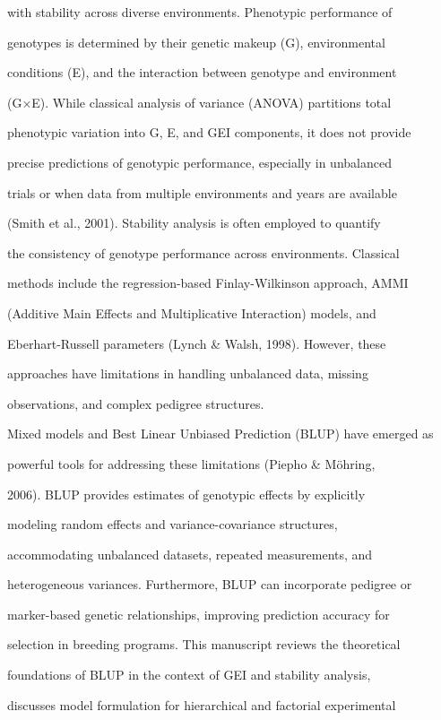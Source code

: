 \documentclass[10pt,twoside]{article}
\numberwithin{equation}{section}
\begin{document}
with stability across diverse environments. Phenotypic performance of

genotypes is determined by their genetic makeup (G), environmental

conditions (E), and the interaction between genotype and environment

(G×E). While classical analysis of variance (ANOVA) partitions total

phenotypic variation into G, E, and GEI components, it does not provide

precise predictions of genotypic performance, especially in unbalanced

trials or when data from multiple environments and years are available

(Smith et al., 2001). Stability analysis is often employed to quantify

the consistency of genotype performance across environments. Classical

methods include the regression-based Finlay-Wilkinson approach, AMMI

(Additive Main Effects and Multiplicative Interaction) models, and

Eberhart-Russell parameters (Lynch \& Walsh, 1998). However, these

approaches have limitations in handling unbalanced data, missing

observations, and complex pedigree structures.



Mixed models and Best Linear Unbiased Prediction (BLUP) have emerged as

powerful tools for addressing these limitations (Piepho \& Möhring,

2006). BLUP provides estimates of genotypic effects by explicitly

modeling random effects and variance-covariance structures,

accommodating unbalanced datasets, repeated measurements, and

heterogeneous variances. Furthermore, BLUP can incorporate pedigree or

marker-based genetic relationships, improving prediction accuracy for

selection in breeding programs. This manuscript reviews the theoretical

foundations of BLUP in the context of GEI and stability analysis,

discusses model formulation for hierarchical and factorial experimental
\end{document}
